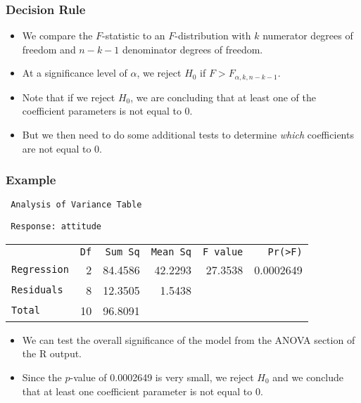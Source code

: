\documentclass[14pt]{beamer}
\begin{document}
\begin{frame}
	\frametitle{Decision Rule}
	
	\begin{itemize}[label={\color{blue}$\blacktriangleright$}]
		\item We compare the $F$-statistic to an $F$-distribution with $k$ numerator degrees of freedom and $n-k-1$ denominator degrees of freedom.
		
		\item At a significance level of $\alpha$, we reject $H_0$ if $F > F_{\alpha,k,n-k-1}$.
		
		\item Note that if we reject $H_0$, we are concluding that at least one of the coefficient parameters is not equal to 0.
		
		\item But we then need to do some additional tests to determine \textit{which} coefficients are not equal to 0.
	\end{itemize}
	
\end{frame}
\begin{frame}
	\frametitle{Example}
	

		{\small
		{\tt\ Analysis of Variance Table}
		\vspace{0.2cm}
		
		{\tt\ Response: attitude}
		\vspace{1mm}
		
		\begin{tabular}{lrrrrr}
		& {\tt Df} & {\tt Sum Sq} & {\tt Mean Sq} & {\tt F value} & {\tt Pr(>F)} \\
			{\tt Regression} & 2 & 84.4586 & 42.2293 & {\color{red}27.3538} & {\color{red}0.0002649} \\
			{\tt Residuals}  & 8 & 12.3505 & 1.5438 & & \\
			{\tt Total}      & 10 & 96.8091 & & & \\
		\end{tabular}}
	\vspace{0.3cm}
	\begin{itemize}[label={\color{blue}$\blacktriangleright$}]
		\item We can test the overall significance of the model from the ANOVA section of the R output.
		
		\item Since the $p$-value of 0.0002649 is very small, we reject $H_0$ and we conclude that at least one coefficient parameter is not equal to 0.
	\end{itemize}
	
\end{frame}
\end{document}
